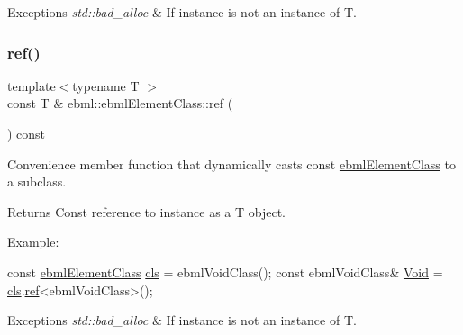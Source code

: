 \begin{DoxyExceptions}{Exceptions}
{\em std\+::bad\+\_\+alloc} & If instance is not an instance of T. \\
\hline
\end{DoxyExceptions}
\mbox{\label{classebml_1_1ebmlElementClass_a174c0bdaef3ec9511f30970c7d0827bc}} 
\subsubsection{\texorpdfstring{ref()}{ref()}\hspace{0.1cm}{\footnotesize\ttfamily [2/2]}}
{\footnotesize\ttfamily template$<$typename T $>$ \\
const T \& ebml\+::ebml\+Element\+Class\+::ref (\begin{DoxyParamCaption}{ }\end{DoxyParamCaption}) const}

Convenience member function that dynamically casts const \mbox{\hyperlink{classebml_1_1ebmlElementClass}{ebml\+Element\+Class}} to a subclass.

\begin{DoxyReturn}{Returns}
Const reference to instance as a T object.
\end{DoxyReturn}
Example\+: 
\begin{DoxyCode}
\textcolor{keyword}{const} \mbox{\hyperlink{classebml_1_1ebmlElementClass_a6c2081870c5d66c70e0cf988ff253420}{ebmlElementClass}} \mbox{\hyperlink{classebml_1_1ebmlElement_a15cf59e94b01e2c49ec96512b9bd9d90}{cls}} = ebmlVoidClass();
\textcolor{keyword}{const} ebmlVoidClass& \mbox{\hyperlink{namespaceebml_afbfd509d1cb71e416a07253746e886e9}{Void}} = \mbox{\hyperlink{classebml_1_1ebmlElement_a15cf59e94b01e2c49ec96512b9bd9d90}{cls}}.\mbox{\hyperlink{classebml_1_1ebmlElementClass_a9ad70f610118f70424b5ff92468ad1ca}{ref}}<ebmlVoidClass>();
\end{DoxyCode}
 
\begin{DoxyExceptions}{Exceptions}
{\em std\+::bad\+\_\+alloc} & If instance is not an instance of T. \\
\hline
\end{DoxyExceptions}
\mbox{\label{classebml_1_1ebmlElementClass_a117d6f78c2bdaa4dbf02cab30510d8f5}} 
